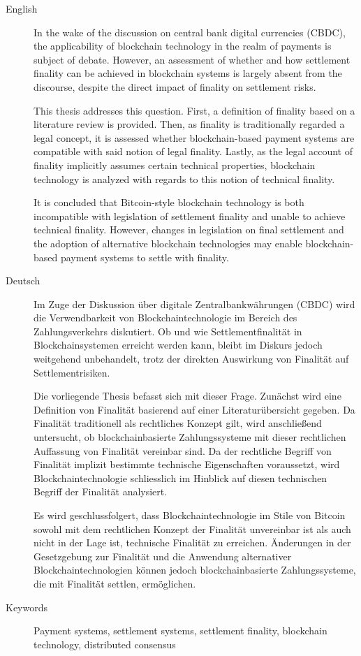 \begin{description}
\item[English]
In the wake of the discussion on central bank digital currencies (CBDC), the applicability of blockchain technology in the realm of payments is subject of debate.
However, an assessment of whether and how settlement finality can be achieved in blockchain systems is largely absent from the discourse, despite the direct impact of finality on settlement risks.

This thesis addresses this question.
First, a definition of finality based on a literature review is provided.
Then, as finality is traditionally regarded a legal concept, it is assessed whether blockchain-based payment systems are compatible with said notion of legal finality.
Lastly, as the legal account of finality implicitly assumes certain technical properties, blockchain technology is analyzed with regards to this notion of technical finality.

It is concluded that Bitcoin-style blockchain technology is both incompatible with legislation of settlement finality and unable to achieve technical finality.
However, changes in legislation on final settlement and the adoption of alternative blockchain technologies may enable blockchain-based payment systems to settle with finality.
\\
\item[Deutsch]
Im Zuge der Diskussion über digitale Zentralbankwährungen (CBDC) wird die Verwendbarkeit von Blockchaintechnologie im Bereich des Zahlungsverkehrs diskutiert.
Ob und wie Settlementfinalität in Blockchainsystemen erreicht werden kann, bleibt im Diskurs jedoch weitgehend unbehandelt, trotz der direkten Auswirkung von Finalität auf Settlementrisiken.

Die vorliegende Thesis befasst sich mit dieser Frage.
Zunächst wird eine Definition von Finalität basierend auf einer Literaturübersicht gegeben.
Da Finalität traditionell als rechtliches Konzept gilt, wird anschließend untersucht, ob blockchainbasierte Zahlungssysteme mit dieser rechtlichen Auffassung von Finalität vereinbar sind.
Da der rechtliche Begriff von Finalität implizit bestimmte technische Eigenschaften voraussetzt, wird Blockchaintechnologie schliesslich im Hinblick auf diesen technischen Begriff der Finalität analysiert.

Es wird geschlussfolgert, dass Blockchaintechnologie im Stile von Bitcoin sowohl mit dem rechtlichen Konzept der Finalität unvereinbar ist als auch nicht in der Lage ist, technische Finalität zu erreichen.
Änderungen in der Gesetzgebung zur Finalität und die Anwendung alternativer Blockchaintechnologien können jedoch blockchainbasierte Zahlungssysteme, die mit Finalität settlen, ermöglichen.
\\
\item[Keywords]
Payment systems, settlement systems, settlement finality, blockchain technology, distributed consensus
\end{description}
